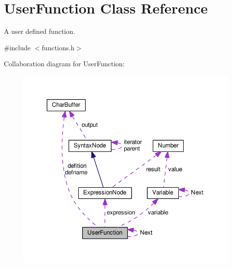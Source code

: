 \hypertarget{classUserFunction}{}\section{User\+Function Class Reference}
\label{classUserFunction}


A user defined function.  




{\ttfamily \#include $<$functions.\+h$>$}



Collaboration diagram for User\+Function\+:\nopagebreak
\begin{figure}[H]
\begin{center}
\leavevmode
\includegraphics[width=343pt]{classUserFunction__coll__graph}
\end{center}
\end{figure}

